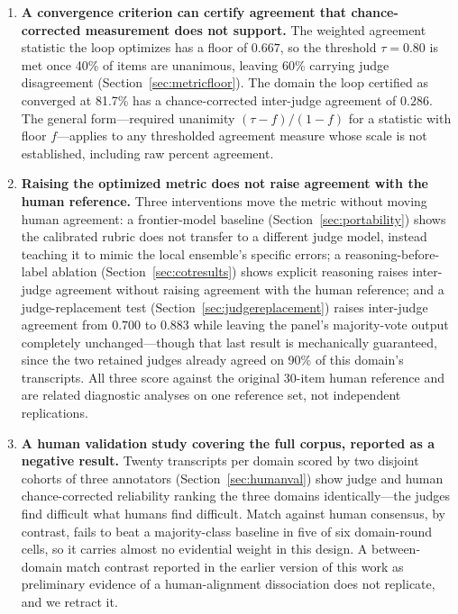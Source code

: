 \documentclass[11pt]{article}
\begin{document}
\begin{enumerate}[leftmargin=*, label=\arabic*.]

\item \textbf{A convergence criterion can certify agreement that
chance-corrected measurement does not support.} The weighted agreement
statistic the loop optimizes has a floor of $0.667$, so the threshold
$\tau = 0.80$ is met once 40\% of items are unanimous, leaving 60\%
carrying judge disagreement (Section~\ref{sec:metricfloor}). The domain
the loop certified as converged at 81.7\% has a chance-corrected
inter-judge agreement of $0.286$. The general form---required unanimity
$(\tau - f)/(1 - f)$ for a statistic with floor $f$---applies to any
thresholded agreement measure whose scale is not established, including
raw percent agreement.

\item \textbf{Raising the optimized metric does not raise agreement with
the human reference.} Three interventions move the metric without moving
human agreement: a frontier-model baseline
(Section~\ref{sec:portability}) shows the calibrated rubric does not
transfer to a different judge model, instead teaching it to mimic the
local ensemble's specific errors; a reasoning-before-label ablation
(Section~\ref{sec:cotresults}) shows explicit reasoning raises inter-judge
agreement without raising agreement with the human reference; and a
judge-replacement test (Section~\ref{sec:judgereplacement}) raises
inter-judge agreement from $0.700$ to $0.883$ while leaving the panel's
majority-vote output completely unchanged---though that last result is
mechanically guaranteed, since the two retained judges already agreed on
90\% of this domain's transcripts. All three score against the original
30-item human reference and are related diagnostic analyses on one
reference set, not independent replications.

\item \textbf{A human validation study covering the full corpus, reported
as a negative result.} Twenty transcripts per domain scored by two
disjoint cohorts of three annotators (Section~\ref{sec:humanval}) show
judge and human chance-corrected reliability ranking the three domains
identically---the judges find difficult what humans find difficult. Match
against human consensus, by contrast, fails to beat a majority-class
baseline in five of six domain-round cells, so it carries almost no
evidential weight in this design. A between-domain match contrast reported
in the earlier version of this work as preliminary evidence of a
human-alignment dissociation does not replicate, and we retract it.


\end{enumerate}
\end{document}
